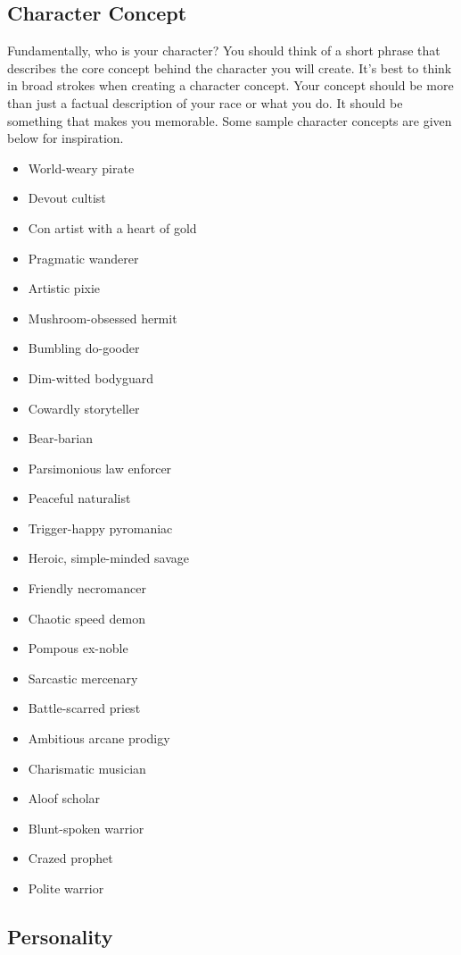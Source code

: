 \subsection{Character Concept}

Fundamentally, who is your character?
You should think of a short phrase that describes the core concept behind the character you will create.
It's best to think in broad strokes when creating a character concept.
Your concept should be more than just a factual description of your race or what you do.
It should be something that makes you memorable.
Some sample character concepts are given below for inspiration.

\begin{itemize}
    \item World-weary pirate
    \item Devout cultist
    \item Con artist with a heart of gold
    \item Pragmatic wanderer
    \item Artistic pixie
    \item Mushroom-obsessed hermit
    \item Bumbling do-gooder
    \item Dim-witted bodyguard
    \item Cowardly storyteller
    \item Bear-barian
    \item Parsimonious law enforcer
    \item Peaceful naturalist
    \item Trigger-happy pyromaniac
    \item Heroic, simple-minded savage
    \item Friendly necromancer
    \item Chaotic speed demon
    \item Pompous ex-noble
    \item Sarcastic mercenary
    \item Battle-scarred priest
    \item Ambitious arcane prodigy
    \item Charismatic musician
    \item Aloof scholar
    \item Blunt-spoken warrior
    \item Crazed prophet
    \item Polite warrior
\end{itemize}

\subsection{Personality}

